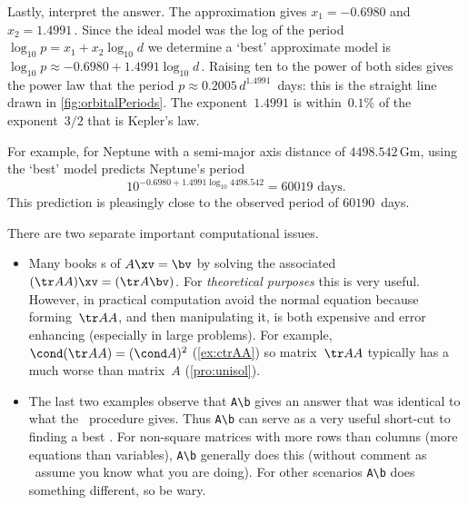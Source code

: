 \begin{example}
\begin{solution}
Lastly, interpret the answer.
The approximation gives \(x_1=-0.6980\) and \(x_2=1.4991\)\,.  
Since the ideal model was the log of the period \(\log_{10}p=x_1+x_2\log_{10}d\) we determine a `best' approximate model is \(\log_{10}p\approx-0.6980+1.4991\log_{10}d\)\,. 
Raising ten to the power of both sides gives the power law that the period \(p\approx0.2005\,d^{1.4991}\)~days: this is the straight line drawn in \cref{fig:orbitalPeriods}.
The exponent~\(1.4991\) is within~\(0.1\)\% of the exponent~\(3/2\) that is Kepler's law.

For example, for Neptune with a semi-major axis distance of \(4498.542\)\,Gm, using the `best' model predicts Neptune's period\[10^{-0.6980+1.4991\log_{10}4498.542}=60019\text{ days.}\]
This prediction is pleasingly close to the observed period of \(60190\)~days.
\end{solution}
\end{example}





\begin{compute}
There are two separate important computational issues.
\begin{itemize}
\item Many books s of \(A\xv=\bv\) by solving the associated  \((\tr AA)\xv=(\tr A\bv)\).  
For \emph{theoretical purposes} this  is very useful.  
However, in practical computation avoid the normal equation because forming~\(\tr AA\), and then manipulating it, is both expensive and error enhancing (especially in large problems).
For example, \(\cond(\tr AA)=(\cond A)^2\) (\cref{ex:ctrAA}) so matrix~\(\tr AA\) typically has a much worse  than matrix~\(A\) (\cref{pro:unisol}).

\item The last two examples observe that \verb|A\b| gives an answer that was identical to what the \svd\ procedure gives.
Thus \verb|A\b| can serve as a very useful short-cut to finding a best .
For non-square matrices with more rows than columns (more equations than variables), \verb|A\b| generally does this (without comment as \script\ assume you know what you are doing).
For other scenarios \verb|A\b| does something different, so be wary.
\end{itemize}
\end{compute}



\begin{comment}
\nakos{\S8.9} has some useful applications to USA NRL rating of quarterbacks---using data from \emph{The Sports Illustrated 19xx Sports Almanac}.
\end{comment}




